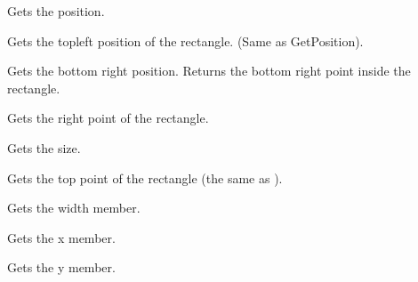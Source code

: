 Gets the position.


\label{wxrectgettopleft}


Gets the topleft position of the rectangle. (Same as GetPosition).


\label{wxrectgetbottomright}


Gets the bottom right position. Returns the bottom right point inside the rectangle.


\label{wxrectgetright}


Gets the right point of the rectangle.


\label{wxrectgetsize}


Gets the size.




\label{wxrectgettop}


Gets the top point of the rectangle (the same as ).


\label{wxrectgetwidth}


Gets the width member.


\label{wxrectgetx}


Gets the x member.


\label{wxrectgety}


Gets the y member.


\label{wxrectinflate}




